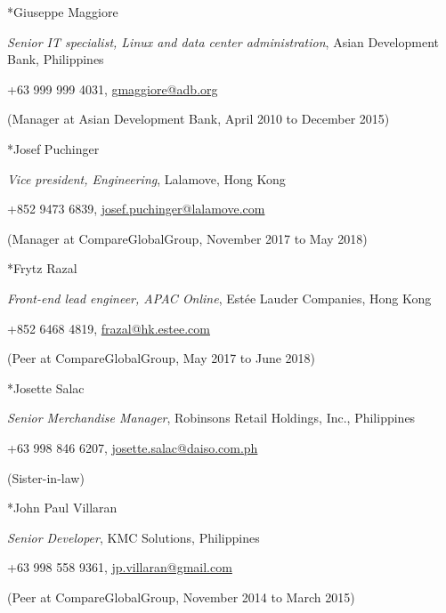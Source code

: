 \documentclass[10pt, a4paper, final]{article}
\begin{document}
\begin{section}
  \begin{subsection}*{Giuseppe Maggiore}
    \begin{compactitem}
      \item[] \textit{Senior IT specialist, Linux and data center administration}, Asian Development Bank, Philippines
      \item[] +63 999 999 4031, \href{mailto:gmaggiore@adb.org}{gmaggiore@adb.org}
      \item[] (Manager at Asian Development Bank, April 2010 to December 2015)
    \end{compactitem}
  \end{subsection}

  \begin{subsection}*{Josef Puchinger}
    \begin{compactitem}
      \item[] \textit{Vice president, Engineering}, Lalamove, Hong Kong
      \item[] +852 9473 6839, \href{mailto:josef.puchinger@lalamove.com}{josef.puchinger@lalamove.com}
      \item[] (Manager at CompareGlobalGroup, November 2017 to May 2018)
    \end{compactitem}
  \end{subsection}

  \begin{subsection}*{Frytz Razal}
    \begin{compactitem}
      \item[] \textit{Front-end lead engineer, APAC Online}, Est{\'e}e Lauder Companies, Hong Kong
      \item[] +852 6468 4819, \href{mailto:frazal@hk.estee.com}{frazal@hk.estee.com}
      \item[] (Peer at CompareGlobalGroup, May 2017 to June 2018)
    \end{compactitem}
  \end{subsection}

  \begin{subsection}*{Josette Salac}
    \begin{compactitem}
      \item[] \textit{Senior Merchandise Manager}, Robinsons Retail Holdings, Inc., Philippines
      \item[] +63 998 846 6207, \href{mailto:josette.salac@daiso.com.ph}{josette.salac@daiso.com.ph}
      \item[] (Sister-in-law)
    \end{compactitem}
  \end{subsection}

  \begin{subsection}*{John Paul Villaran}
    \begin{compactitem}
      \item[] \textit{Senior Developer}, KMC Solutions, Philippines
      \item[] +63 998 558 9361, \href{mailto:jp.villaran@gmail.com}{jp.villaran@gmail.com}
      \item[] (Peer at CompareGlobalGroup, November 2014 to March 2015)
    \end{compactitem}
  \end{subsection}
\end{section}
\vspace{1em}
\end{document}
